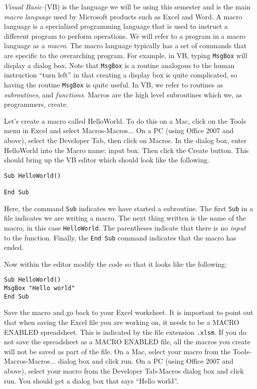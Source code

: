 \documentclass[10pt]{article}
\begin{document}
{\it Visual Basic} (VB) is the language we will be using this semester and is the main {\it macro language} used by Microsoft products such as Excel and Word. A macro language is a specialized programming language that is used to instruct a different program to perform operations. We will refer to a program in a macro language as a {\it macro}. The macro language typically has a set of commands that are specific to the overarching program. For example, in VB, typing {\tt MsgBox} will display a dialog box. Note that {\tt MsgBox} is a routine analogous to the human instruction ``turn left'' in that creating a display box is quite complicated, so having the routine {\tt MsgBox} is quite useful.  In VB, we refer to routines as {\it subroutines}, and {\it functions}. Macros are the high level subroutines which we, as programmers, create. %

Let's create a macro called HelloWorld. To do this on a Mac, click on the Tools menu in Excel and select Macros-Macros...  On a PC (using Office 2007 and above), select the Developer Tab, then click on Macros.
In the dialog box, enter HelloWorld into the Macro name: input box. Then click the Create button. This should bring
up the VB editor which should look like the following.
\begin{verbatim}
Sub HelloWorld()

End Sub
\end{verbatim}
Here, the command {\tt Sub} indicates we have started a
subroutine. The first {\tt Sub} in a file indicates we are writing a
macro. The next thing written is the name of the macro, in this case
{\tt HelloWorld}. The parentheses indicate that there is no {\it
  input} to the function. %
Finally, the {\tt End Sub} command indicates that the macro has ended.


Now within the editor modify the code so that it looks like the following:
\begin{verbatim}
Sub HelloWorld()
MsgBox "Hello world"
End Sub
\end{verbatim}
Save the macro and go back to your Excel worksheet. It is important to point out that when saving the Excel file you are working on, it needs to be a MACRO ENABLED spreadsheet.  This is indicated by the file extension {\tt .xlsm}.  If you do not save the spreadsheet as a MACRO ENABLED file, all the macros you create will not be saved as part of the file.  On a Mac, select your macro from the Tools-Macros-Macros... dialog box and click run. On a PC (using Office 2007 and above), select your macro from the Developer Tab-Macros dialog box and click run. You should get a dialog box that says ``Hello world''. 
\end{document}
